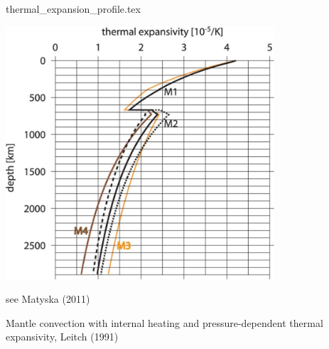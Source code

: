 \begin{flushright} {\tiny {\color{gray} thermal\_expansion\_profile.tex}} \end{flushright}

\includegraphics[width=10cm]{images/thermal_expansion/stca06.jpg}

see Matyska \etal (2011) \cite{mayw11}

Mantle convection with internal heating and pressure-dependent thermal expansivity, Leitch \etal (1991) \cite{leys91}
